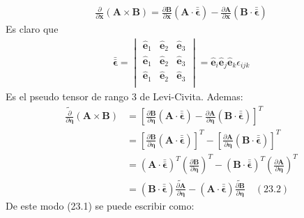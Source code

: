 \documentclass[a4paper]{article}
\begin{document}
\begin{answer}[Punto 23]
\begin{align*}
            \frac{\partial } {\partial \mathbf{x}} \left(\mathbf A \times \mathbf B\right) = \frac{\partial \mathbf B}{\partial \mathbf x} \left( \mathbf A \cdot \bar{\bar{\pmb \epsilon}}
            \right) - \frac{\partial \mathbf A}{\partial \mathbf{x}} \left( \mathbf B\cdot \bar{\bar{\pmb \epsilon}}
            \right)
        \end{align*}
        Es claro que 
        \begin{align*}
            \bar{\bar {\pmb \epsilon}} = \begin{vmatrix}
                \mathbf {\hat e}_1 & \mathbf{\hat e}_2 & \mathbf{\hat e}_3\\
                \mathbf {\hat e}_1 & \mathbf{\hat e}_2 & \mathbf{\hat e}_3\\
                \mathbf {\hat e}_1 & \mathbf{\hat e}_2 & \mathbf{\hat e}_3\\
            \end{vmatrix} = \mathbf {\hat e}_i \mathbf{\hat e}_j \mathbf{\hat e}_k \epsilon_{ijk}
        \end{align*}
        Es el pseudo tensor de rango 3 de Levi-Civita. Ademas:
        \begin{align*}
            \tilde{\frac{\partial}{\partial \pmb \eta}}\left(\mathbf A \times \mathbf B\right) &= \left[ \frac{\partial \mathbf B}{\partial \pmb \eta} \left( \mathbf A \cdot \bar{\bar{\pmb \epsilon}} 
            \right) - \frac{\partial \mathbf A}{\partial \pmb \eta} \left( \mathbf B\cdot \bar{\bar{\pmb \epsilon}} 
            \right)\right]^T \\
            &= \left[ \frac{\partial \mathbf B}{\partial \pmb \eta} \left( \mathbf A \cdot \bar{\bar{\pmb \epsilon}}
            \right)\right]^T - \left[\frac{\partial \mathbf A}{\partial \pmb \eta} \left( \mathbf B\cdot \bar{\bar{\pmb \epsilon}}
            \right)\right]^T\\
            &= \left( \mathbf A \cdot \bar{\bar{\pmb \epsilon}}\right)^T \left(\frac{\partial \mathbf B}{\partial \pmb \eta}\right)^T - \left( \mathbf B\cdot \bar{\bar{\pmb \epsilon}}\right)^T \left(\frac{\partial \mathbf A}{\partial \pmb \eta}\right)^T\\
            &= \left( \mathbf B\cdot \bar{\bar{\pmb \epsilon}}\right) \tilde{\frac{\partial \mathbf A}{\partial \pmb \eta}}-\left( \mathbf A \cdot \bar{\bar{\pmb \epsilon}}\right) \tilde{\frac{\partial \mathbf B}{\partial \pmb \eta}} \quad (23.2)
        \end{align*}
        De este modo (23.1) se puede escribir como:

\end{answer}
\end{document}
